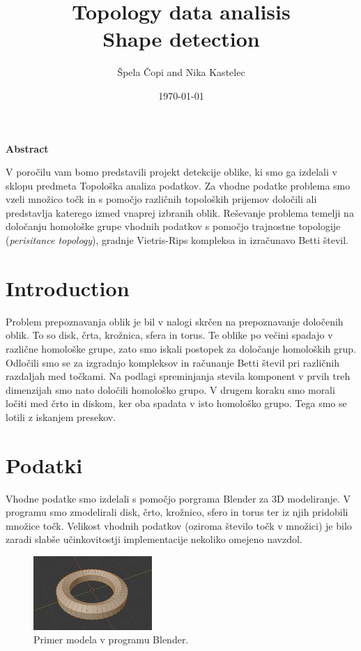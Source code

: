 \documentclass[a4paper,11pt]{article}
\title{ Topology data analisis \\ Shape detection}
\author{Špela Čopi and Nika Kastelec }
\date{\today}
\begin{document}
\maketitle

\begin{center}
\textbf{Abstract}
\end{center}

\begin{center}

V poročilu vam bomo predstavili projekt detekcije oblike, ki smo ga izdelali v sklopu predmeta Topološka analiza podatkov. Za vhodne podatke problema smo vzeli množico točk in s pomočjo različnih topoloških prijemov določili ali predstavlja katerego izmed vnaprej izbranih oblik. Reševanje problema temelji na določanju homološke grupe vhodnih podatkov s pomočjo trajnostne topologije (\textit{perisitance topology}), gradnje Vietris-Rips kompleksa in izračunavo Betti števil.

\end{center}


\section{Introduction}

Problem prepoznavanja oblik je bil v nalogi skrčen na prepoznavanje določenih oblik. To so disk, črta, krožnica, sfera in torus. Te oblike po večini spadajo v različne homološke grupe, zato smo iskali postopek za določanje homoloških grup. Odločili smo se za izgradnjo kompleksov in računanje Betti števil pri različnih razdaljah med točkami. Na podlagi spreminjanja stevila komponent v prvih treh dimenzijah smo nato določili homološko grupo. 
V drugem koraku smo morali ločiti med črto in diskom, ker oba spadata v isto homološko grupo. Tega smo se lotili z iskanjem presekov. 

\section{Podatki}

Vhodne podatke smo izdelali s pomočjo porgrama Blender za 3D modeliranje. V programu smo zmodelirali disk, črto, krožnico, sfero in torus ter iz njih pridobili množice točk. Velikost vhodnih podatkov (oziroma število točk v množici) je bilo zaradi slabše učinkovitostji implementacije nekoliko omejeno navzdol. 

\begin{figure}[h]
\centering
\includegraphics[width=0.4\textwidth]{blender_torus}
\caption{Primer modela v programu Blender.}
\end{figure}
  
\end{document}
